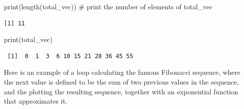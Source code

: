 \documentclass[
  letterpaper,
  DIV=11,
  numbers=noendperiod]{scrreprt}
\newenvironment{Shaded}{\begin{snugshade}}{\end{snugshade}}
\newcommand{\CommentTok}[1]{\textcolor[rgb]{0.37,0.37,0.37}{#1}}
\newcommand{\FunctionTok}[1]{\textcolor[rgb]{0.28,0.35,0.67}{#1}}
\newcommand{\NormalTok}[1]{\textcolor[rgb]{0.00,0.23,0.31}{#1}}
\begin{document}
\begin{Shaded}
\begin{Highlighting}[]
\FunctionTok{print}\NormalTok{(}\FunctionTok{length}\NormalTok{(total\_vec)) }\CommentTok{\# print the number of elements of total\_vec}
\end{Highlighting}
\end{Shaded}

\begin{verbatim}
[1] 11
\end{verbatim}

\begin{Shaded}
\begin{Highlighting}[]
\FunctionTok{print}\NormalTok{(total\_vec)}
\end{Highlighting}
\end{Shaded}

\begin{verbatim}
 [1]  0  1  3  6 10 15 21 28 36 45 55
\end{verbatim}

Here is an example of a loop calculating the famous Fibonacci sequence,
where the next value is defined to be the sum of two previous values in
the sequence, and the plotting the resulting sequence, together with an
exponential function that approximates it.
\end{document}
